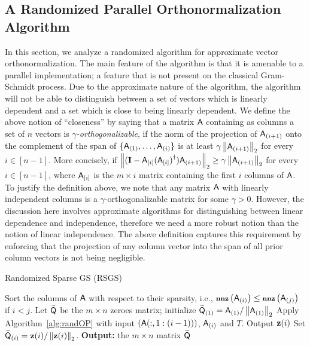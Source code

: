 \subsection{A Randomized Parallel Orthonormalization Algorithm}\label{sec:result}
In this section, we analyze a randomized algorithm for approximate vector orthonormalization. The main feature of the algorithm is that it is amenable to a parallel implementation; a feature that is not present on the classical Gram-Schmidt process. Due to the approximate nature of the algorithm, the algorithm will not be able to distinguish between a set of vectors which is linearly dependent and a set which is close to being linearly dependent. We define the above notion of ``closeness'' by saying that a matrix ${\mathsf{A} }$ containing as columns a set of $n$ vectors is \emph{$\gamma$-orthogonalizable}, if the norm of the projection of ${\mathsf{A} }_{(i+1)}$ onto the complement of the span of $\{{\mathsf{A} }_{(1)},\ldots ,{\mathsf{A} }_{(i)}\}$ is at least $\gamma\left\|{\mathsf{A} }_{(i+1)}\right\|_2$ for every $i\in{[n-1]}$. More concisely, if $\left\|(\mathbf{I} - {\mathsf{A} }_{[i]}{({\mathsf{A} }_{[i]})}^\dagger){\mathsf{A} }_{(i+1)}\right\|_2 \geq \gamma \left\|{\mathsf{A} }_{(i+1)}\right\|_2$ for every $i\in{[n-1]}$, where ${\mathsf{A} }_{[i]}$ is the $m\times i$ matrix containing the first $i$ columns of ${\mathsf{A} }$. To justify the definition above, we note that any matrix ${\mathsf{A} }$ with linearly independent columns is a $\gamma$-orthogonalizable matrix for some $\gamma>0$. However, the discussion here involves approximate algorithms for distinguishing between linear dependence and independence, therefore we need a more robust notion than the notion of linear independence. The above definition captures this requirement by enforcing that the projection of any column vector into the span of all prior column vectors is not being negligible.
%
%
%
\begin{algorithm}{}
	\caption{Randomized Sparse GS (RSGS)}\label{alg:RSGS}
\begin{algorithmic}[1]
	\State Sort the columns of ${\mathsf{A} }$ with respect to their sparsity, i.e., $\operatorname{\textbf{\footnotesize nnz}}\left({\mathsf{A} }_{(i)}\right) \leq \operatorname{\textbf{\footnotesize nnz}}\left({\mathsf{A} }_{(j)}\right)$ if $i<j$.
	\State Let $\widetilde{{\mathsf{Q} }}$ be the $m\times n$ zeroes matrix; initialize $\widetilde{{\mathsf{Q} }}_{(1)} = {\mathsf{A} }_{(1)} / \left\|{\mathsf{A} }_{(1)}\right\|_2$
	\State 	Apply Algorithm~\ref{alg:randOP} with input $({\mathsf{A} } (:, 1 : (i-1) ))$, ${\mathsf{A} }_{(i)}$ and $T$. Output $\mathbf{z}(i)$
	\State Set $\widetilde{{\mathsf{Q} }}_{(i)} = \mathbf{z} (i) / \left\|\mathbf{z} (i)\right\|_2$.
	\EndFor
	\State \textbf{Output:} the $m\times n$ matrix $\widetilde{{\mathsf{Q} }}$
\EndProcedure
\end{algorithmic}
\end{algorithm}

